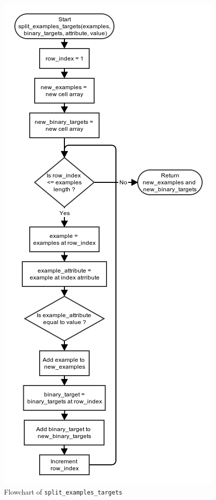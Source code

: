 \documentclass[10pt,a4paper]{article}
\begin{document}
\begin{figure}[!ht]
	\centering
	\includegraphics[height=0.9\textheight]{images/flow_chart/split_examples_targets.png}
	\caption{Flowchart of \tt{split\_examples\_targets}}
	\label{fig:split_examples_targets}
\end{figure}
\end{document}
